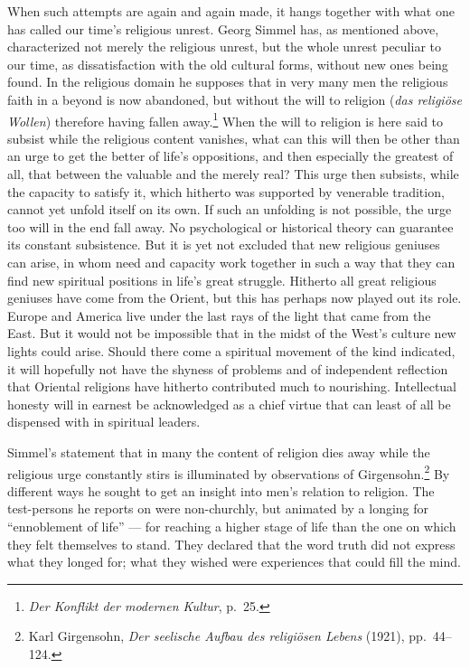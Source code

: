 \documentclass[12pt]{book}
\newcommand{\opage}[1]{\marginnote{\footnotesize\textit{[#1]}}}
\begin{document}
\opage{105}When such attempts are again and again made, it hangs together with what one has called our time's religious
unrest. Georg Simmel has, as mentioned above, characterized not merely the religious unrest, but the whole
unrest peculiar to our time, as dissatisfaction with the old cultural forms, without new ones being found.
In the religious domain he supposes that in very many men the religious faith in a beyond is now abandoned,
but without the will to religion (\textit{das religiöse Wollen}) therefore having fallen away.\footnote{\textit{Der
Konflikt der modernen Kultur}, p.\ 25.} When the will to religion is here said to subsist while the religious
content vanishes, what can this will then be other than an urge to get the better of life's oppositions, and
then especially the greatest of all, that between the valuable and the merely real? This urge then subsists,
while the capacity to satisfy it, which hitherto was supported by venerable tradition, cannot yet unfold
itself on its own. If such an unfolding is not possible, the urge too will in the end fall away. No
psychological or historical theory can guarantee its constant subsistence. But it is yet not excluded that
new religious geniuses can arise, in whom need and capacity work together in such a way that they can find
new spiritual positions in life's great struggle. Hitherto all great religious geniuses have come from the
Orient, but this has perhaps now played out its role. Europe and America live under the last rays of the
light that came from the East. But it would not be impossible that in the midst of the West's culture new
lights could arise. Should there come a spiritual movement of the kind indicated, it will hopefully not have
the shyness of problems and of independent reflection that Oriental religions have hitherto contributed much
\opage{106}to nourishing. Intellectual honesty will in earnest be acknowledged as a chief virtue that can least of all
be dispensed with in spiritual leaders.

Simmel's statement that in many the content of religion dies away while the religious urge constantly stirs is
illuminated by observations of Girgensohn.\footnote{Karl Girgensohn, \textit{Der seelische Aufbau des
religiösen Lebens} (1921), pp.\ 44--124.} By different ways he sought to get an insight into men's relation to
religion. The test-persons he reports on were non-churchly, but animated by a longing for ``ennoblement of
life'' --- for reaching a higher stage of life than the one on which they felt themselves to stand. They
declared that the word truth did not express what they longed for; what they wished were experiences that
could fill the mind.
\end{document}
